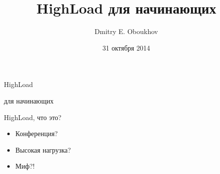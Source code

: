 \documentclass[aspectratio=169]{beamer}
\title{HighLoad для начинающих}
\author{Dmitry E. Oboukhov}
\date{31 октября 2014}
\begin{document}

\begin{frame}
    \begin{block}
        {\huge HighLoad}
        \par
        {\huge для начинающих}
    \end{block}
\end{frame}


\maketitle

\begin{frame}{HighLoad, что это?}
    \begin{itemize}

        \item Конференция?
        
        \pause
        \item Высокая нагрузка?

        \pause
        \item Миф?!
    
    \end{itemize}
\end{frame}
\end{document}
